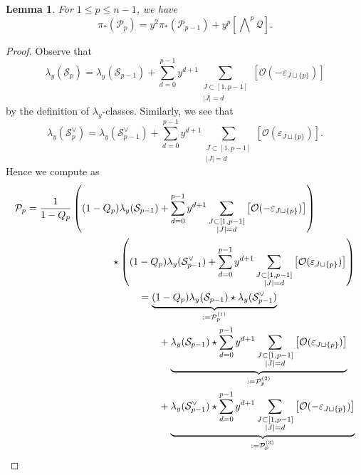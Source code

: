 \documentclass[a4paper, 11pt, reqno]{amsart}
\numberwithin{equation}{section}
\newcommand{\CO}{\mathcal{O}}
\newcommand{\CP}{\mathcal{P}}
\newcommand{\CQ}{\mathcal{Q}}
\newcommand{\CS}{\mathcal{S}}
\newcommand{\ve}{\varepsilon}
\newcommand{\class}[1]{\left[ #1 \right]}
\newcommand{\extprod}{\bigwedge\nolimits}
\theoremstyle{plain}
\newtheorem{lem}[thm]{Lemma}
\theoremstyle{definition}
\theoremstyle{remark}
\begin{document}
\begin{lem}
For $1 \le p \le n-1$, we have 
\begin{equation} \label{eq:recursive}
\pi_{\ast}(\CP_{p}) = y^{2} \pi_{\ast}(\CP_{p-1}) + y^{p} \class{\extprod^{p} \CQ}. 
\end{equation}
\end{lem}
\begin{proof}
Observe that 
\begin{equation}
\lambda_{y}(\CS_{p}) = \lambda_{y}(\CS_{p-1}) + \sum_{d=0}^{p-1} y^{d+1} \sum_{\substack{J \subset [1, p-1] \\ |J| = d}} \class{\CO(-\ve_{J \sqcup \{p\}})}
\end{equation}
by the definition of $\lambda_{y}$-classes. Similarly, we see that 
\begin{equation}
\lambda_{y}(\CS_{p}^{\vee}) = \lambda_{y}(\CS_{p-1}^{\vee}) + \sum_{d=0}^{p-1} y^{d+1} \sum_{\substack{J \subset [1, p-1] \\ |J| = d}} \class{\CO(\ve_{J \sqcup \{p\}})}. 
\end{equation}
Hence we compute as 
\begin{align}
\begin{split}
\CP_{p} &= \frac{1}{1-Q_{p}} \left( (1-Q_{p}) \lambda_{y}(\CS_{p-1}) + \sum_{d=0}^{p-1} y^{d+1} \sum_{\substack{J \subset [1, p-1] \\ |J| = d}} \class{\CO(-\ve_{J \sqcup \{p\}})} \right) \\ 
& \hspace{30mm} \star \left( (1-Q_{p}) \lambda_{y}(\CS_{p-1}^{\vee}) + \sum_{d=0}^{p-1} y^{d+1} \sum_{\substack{J \subset [1, p-1] \\ |J| = d}} \class{\CO(\ve_{J \sqcup \{p\}})} \right) 
\end{split} \\ 
\begin{split}
&= \underbrace{(1-Q_{p}) \lambda_{y}(\CS_{p-1}) \star \lambda_{y}(\CS_{p-1}^{\vee})}_{:= \CP_{p}^{(1)}} \\ 
& \qquad + \underbrace{\lambda_{y}(\CS_{p-1}) \star \sum_{d=0}^{p-1} y^{d+1} \sum_{\substack{J \subset [1, p-1] \\ |J| = d}} \class{\CO(\ve_{J \sqcup \{p\}})}}_{:= \CP_{p}^{(2)}} \\ 
& \qquad + \underbrace{\lambda_{y}(\CS_{p-1}^{\vee}) \star \sum_{d=0}^{p-1} y^{d+1} \sum_{\substack{J \subset [1, p-1] \\ |J| = d}} \class{\CO(-\ve_{J \sqcup \{p\}})}}_{:= \CP_{p}^{(3)}} \\ 

\end{split}
\end{align}
\end{proof}
\end{document}
